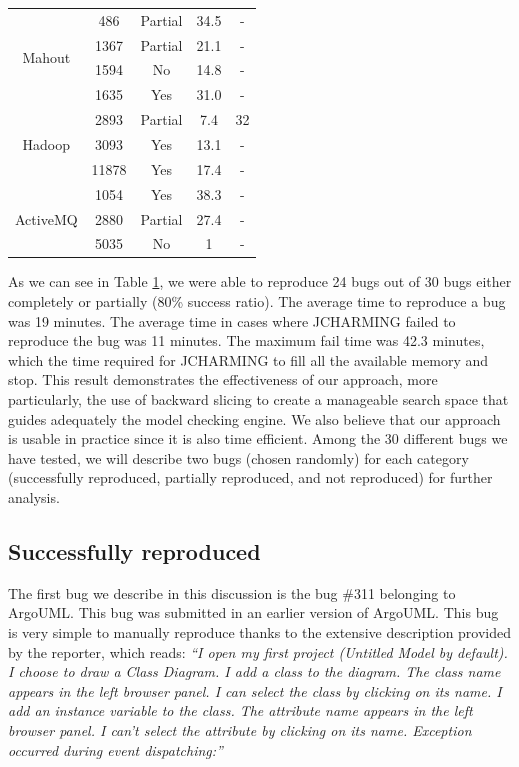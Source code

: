 \documentclass[times]{smrauth}
\begin{document}
\begin{table}[h!]
\begin{tabular}{c|c|c|c|c}
\multirow{4}{*}{Mahout}   & 486      & Partial & 34.5     & -        \\
                            & 1367     & Partial & 21.1     & -       \\ 
                            & 1594 	   & No 	 & 14.8 	    & -       \\
                            & 1635     & Yes     & 31.0     & - \\ \hline 
\multirow{3}{*}{Hadoop}     & 2893     & Partial & 7.4      & 32       \\
						    & 3093     & Yes 	 & 13.1     & -        \\
                            & 11878    & Yes 	 & 17.4     & - \\  \hline 
\multirow{3}{*}{ActiveMQ}   & 1054     & Yes     & 38.3     & -      \\
						    & 2880     & Partial & 27.4        & -        \\
                            & 5035     & No 	 & 1    & - \\  \hline \hline             
\end{tabular}


\label{tab:jcharming-results}
\end{table}

As we can see in Table \ref{tab:jcharming-results}, we were able to reproduce 24 bugs
out of 30 bugs either completely or partially (80\% success ratio). The average time to reproduce a bug was 19 minutes. The average time in cases where JCHARMING failed to reproduce the bug  was 11 minutes. The maximum fail time was 42.3 minutes, which the time 
required for JCHARMING to fill all the available memory and stop.
This result demonstrates the effectiveness of our approach,
more particularly, the use of backward slicing to create a
manageable search space that guides adequately the model
checking engine. We also believe that our approach is usable
in practice since it is also time efficient. Among the 30 different bugs we have tested, we will describe
two bugs (chosen randomly) for each category (successfully
reproduced, partially reproduced, and not reproduced) for
further analysis.

\subsection{Successfully reproduced}

The first bug we describe in this discussion is the bug \#311
belonging to ArgoUML. This bug was submitted in an earlier
version of ArgoUML. This bug is very simple to manually
reproduce thanks to the extensive description provided by the
reporter, which reads: {\it ``I open my first project (Untitled Model by default). I choose
to draw a Class Diagram. I add a class to the diagram. The
class name appears in the left browser panel. I can select the
class by clicking on its name. I add an instance variable to the
class. The attribute name appears in the left browser panel. I
can't select the attribute by clicking on its name. Exception
occurred during event dispatching:''}
\end{document}
